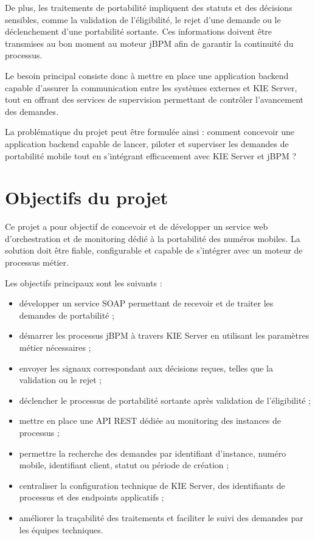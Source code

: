 \documentclass[12pt,a4paper]{report}
\begin{document}
De plus, les traitements de portabilité impliquent des statuts et des décisions sensibles, comme la validation de l'éligibilité, le rejet d'une demande ou le déclenchement d'une portabilité sortante. Ces informations doivent être transmises au bon moment au moteur jBPM afin de garantir la continuité du processus.

Le besoin principal consiste donc à mettre en place une application backend capable d'assurer la communication entre les systèmes externes et KIE Server, tout en offrant des services de supervision permettant de contrôler l'avancement des demandes.

La problématique du projet peut être formulée ainsi : comment concevoir une application backend capable de lancer, piloter et superviser les demandes de portabilité mobile tout en s'intégrant efficacement avec KIE Server et jBPM ?

\section{Objectifs du projet}
Ce projet a pour objectif de concevoir et de développer un service web d'orchestration et de monitoring dédié à la portabilité des numéros mobiles. La solution doit être fiable, configurable et capable de s'intégrer avec un moteur de processus métier.

Les objectifs principaux sont les suivants :
\begin{itemize}
    \item développer un service SOAP permettant de recevoir et de traiter les demandes de portabilité ;
    \item démarrer les processus jBPM à travers KIE Server en utilisant les paramètres métier nécessaires ;
    \item envoyer les signaux correspondant aux décisions reçues, telles que la validation ou le rejet ;
    \item déclencher le processus de portabilité sortante après validation de l'éligibilité ;
    \item mettre en place une API REST dédiée au monitoring des instances de processus ;
    \item permettre la recherche des demandes par identifiant d'instance, numéro mobile, identifiant client, statut ou période de création ;
    \item centraliser la configuration technique de KIE Server, des identifiants de processus et des endpoints applicatifs ;
    \item améliorer la traçabilité des traitements et faciliter le suivi des demandes par les équipes techniques.
\end{itemize}
\end{document}
